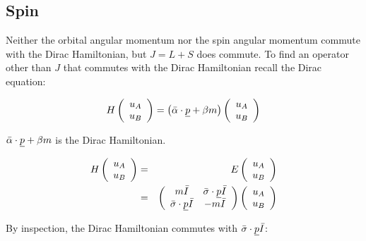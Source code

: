 \subsection{Spin}

Neither the orbital angular momentum nor the spin angular momentum commute with the Dirac Hamiltonian, but $J = L + S$ does commute.  To find an operator other than $J$ that commutes with the Dirac Hamiltonian recall the Dirac equation:

\[
  H
  \left(
    \begin{array}{c}
    u_A \\
    u_B
    \end{array}
  \right)
  =
  \left(\bar{\alpha}\cdot\underline{p} + \beta m\right)
  \left(
    \begin{array}{c}
    u_A \\
    u_B
    \end{array}
  \right)
\]

$\bar{\alpha}\cdot\underline{p} + \beta m$ is the Dirac Hamiltonian.

\begin{eqnarray*}
  H
  \left(
    \begin{array}{c}
    u_A \\
    u_B
    \end{array}
  \right)
  & = &
  E
  \left(
    \begin{array}{c}
    u_A \\
    u_B
    \end{array}
  \right)
  \\
  & = &
  \left(
    \begin{array}{cc}
    m\bar{I} & \bar{\sigma}\cdot\underline{p}\bar{I} \\
    \bar{\sigma}\cdot\underline{p}\bar{I} & -m\bar{I}
    \end{array}
  \right)
  \left(
    \begin{array}{c}
    u_A \\
    u_B
    \end{array}
  \right)
\end{eqnarray*}

By inspection, the Dirac Hamiltonian commutes with $\bar{\sigma}\cdot\underline{p}\bar{I}$:

